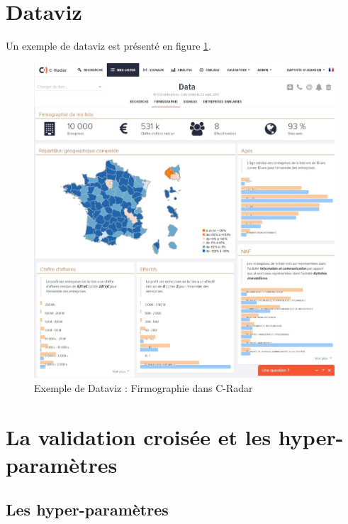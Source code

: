 \section{Dataviz}
\label{annexe:firmo}
    Un exemple de dataviz est présenté en figure \ref{fig:firmo}.
    \begin{figure}[h!]
        \centering
        \includegraphics[width=\textwidth]{images/firmo.jpg}
        \caption{Exemple de Dataviz : Firmographie dans C-Radar}
        \label{fig:firmo}
    \end{figure}

\section{La validation croisée et les hyper-paramètres}
    \subsection{Les hyper-paramètres}
    \label{annexe:hyper_param}

